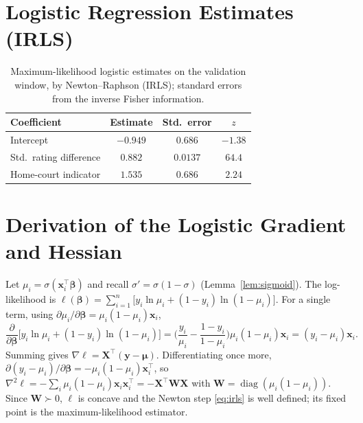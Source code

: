 \documentclass[11pt]{article}
\begin{document}
\section{Logistic Regression Estimates (IRLS)}
\begin{table}[h]
\centering
\begin{tabular}{lccc}
\toprule
Coefficient & Estimate & Std.\ error & $z$ \\
\midrule
Intercept & $-0.949$ & $0.686$ & $-1.38$ \\
Std.\ rating difference & $0.882$ & $0.0137$ & $64.4$ \\
Home-court indicator & $1.535$ & $0.686$ & $2.24$ \\
\bottomrule
\end{tabular}
\caption{Maximum-likelihood logistic estimates on the validation window, by
Newton--Raphson (IRLS); standard errors from the inverse Fisher information.}
\end{table}

\section{Derivation of the Logistic Gradient and Hessian}
Let $\mu_i = \sigma(\mathbf x_i^\top\boldsymbol\beta)$ and recall
$\sigma' = \sigma(1-\sigma)$ (Lemma~\ref{lem:sigmoid}). The log-likelihood is
$\ell(\boldsymbol\beta) = \sum_{i=1}^n\big[y_i\ln\mu_i + (1-y_i)\ln(1-\mu_i)\big]$.
For a single term, using $\partial\mu_i/\partial\boldsymbol\beta = \mu_i(1-\mu_i)\mathbf x_i$,
\[
\frac{\partial}{\partial\boldsymbol\beta}\big[y_i\ln\mu_i+(1-y_i)\ln(1-\mu_i)\big]
= \Big(\frac{y_i}{\mu_i} - \frac{1-y_i}{1-\mu_i}\Big)\mu_i(1-\mu_i)\mathbf x_i
= (y_i-\mu_i)\mathbf x_i .
\]
Summing gives $\nabla\ell = \mathbf X^\top(\mathbf y-\boldsymbol\mu)$.
Differentiating once more,
$\partial(y_i-\mu_i)/\partial\boldsymbol\beta = -\mu_i(1-\mu_i)\mathbf x_i^\top$, so
$\nabla^2\ell = -\sum_i \mu_i(1-\mu_i)\mathbf x_i\mathbf x_i^\top
= -\mathbf X^\top\mathbf W\mathbf X$ with $\mathbf W=\operatorname{diag}(\mu_i(1-\mu_i))$.
Since $\mathbf W\succ 0$, $\ell$ is concave and the Newton step \eqref{eq:irls}
is well defined; its fixed point is the maximum-likelihood estimator.
\end{document}
